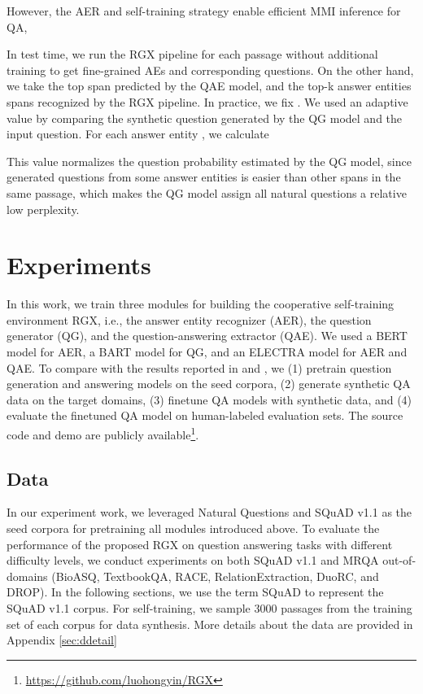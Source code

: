 \documentclass[11pt,a4paper]{article}
\begin{document}
However, the AER and self-training strategy enable efficient MMI inference for QA,

In test time, we run the RGX pipeline for each passage without additional training to get fine-grained AEs and corresponding questions. On the other hand, we take the top span predicted by the QAE model, and the top-k answer entities spans recognized by the RGX pipeline. In practice, we fix . We used an adaptive  value by comparing the synthetic question generated by the QG model and the input question. For each answer entity , we calculate

This value normalizes the question probability  estimated by the QG model, since generated questions from some answer entities is easier than other spans in the same passage, which makes the QG model assign all natural questions a relative low perplexity.



\section{Experiments}
In this work, we train three modules for building the cooperative self-training environment RGX, i.e., the answer entity recognizer (AER), the question generator (QG), and the question-answering extractor (QAE). We used a BERT \cite{devlin2018bert} model for AER, a BART \cite{lewis2019bart} model for QG, and an ELECTRA \cite{clark2019electra} model for AER and QAE. To compare with the results reported in \citet{shakeri2020end} and \citet{bartolo2021improving}, we (1) pretrain question generation and answering models on the seed corpora, (2) generate synthetic QA data on the target domains, (3) finetune QA models with synthetic data, and (4) evaluate the finetuned QA model on human-labeled evaluation sets. The source code and demo are publicly available\footnote{\url{https://github.com/luohongyin/RGX}}.



\subsection{Data}
In our experiment work, we leveraged Natural Questions \cite{kwiatkowski2019natural} and SQuAD v1.1 \cite{rajpurkar2016SQuAD} as the seed corpora for pretraining all modules introduced above. To evaluate the performance of the proposed RGX on question answering tasks with different difficulty levels, we conduct experiments on both SQuAD v1.1 \cite{rajpurkar2016SQuAD} and MRQA \cite{fisch2019mrqa} out-of-domains (BioASQ, TextbookQA, RACE, RelationExtraction, DuoRC, and DROP). In the following sections, we use the term SQuAD to represent the SQuAD v1.1 corpus. For self-training, we sample 3000 passages from the training set of each corpus for data synthesis. More details about the data are provided in Appendix \ref{sec:ddetail}
\end{document}
